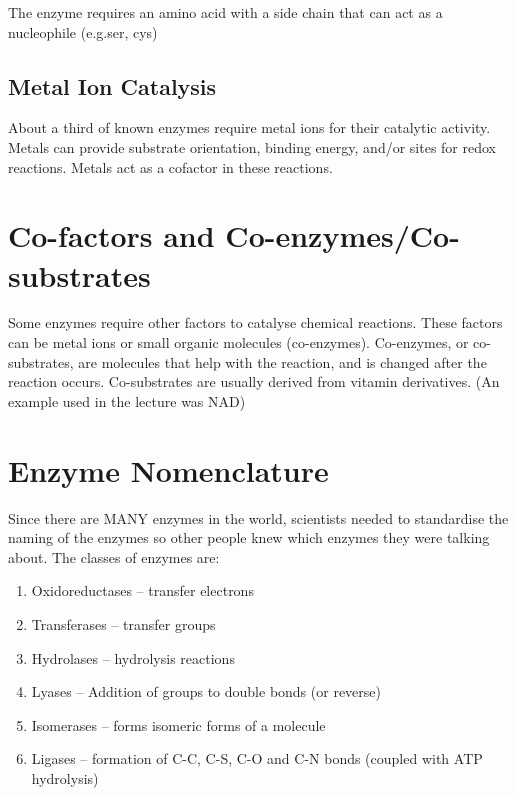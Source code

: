 \begin{center}
\end{center}

The enzyme requires an amino acid with a side chain that can act as a nucleophile (e.g.ser, cys)

\subsection{Metal Ion Catalysis}

About a third of known enzymes require metal ions for their catalytic activity.
Metals can provide substrate orientation, binding energy, and/or sites for redox reactions.
Metals act as a cofactor in these reactions.

\section{Co-factors and Co-enzymes/Co-substrates}

Some enzymes require other factors to catalyse chemical reactions.
These factors can be metal ions or small organic molecules (co-enzymes).
Co-enzymes, or co-substrates, are molecules that help with the reaction, and is changed after the reaction occurs.
Co-substrates are usually derived from vitamin derivatives.
(An example used in the lecture was NAD)

\section{Enzyme Nomenclature}

Since there are MANY enzymes in the world, scientists needed to standardise the naming of the enzymes so other people knew which enzymes they were talking about.
The classes of enzymes are:

\begin{enumerate}
\item Oxidoreductases -- transfer electrons
\item Transferases -- transfer groups
\item Hydrolases -- hydrolysis reactions
\item Lyases -- Addition of groups to double bonds (or reverse)
\item Isomerases -- forms isomeric forms of a molecule
\item Ligases -- formation of C-C, C-S, C-O and C-N bonds (coupled with ATP hydrolysis)
\end{enumerate}
